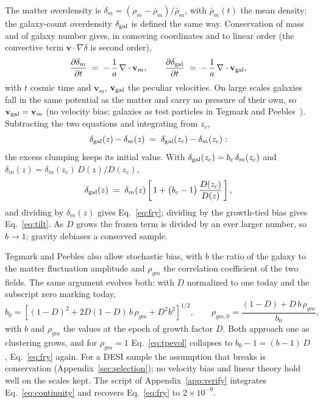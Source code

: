 The matter overdensity is $\delta_m = (\rho_m - \bar\rho_m)/\bar\rho_m$,
with $\bar\rho_m(t)$ the mean density; the galaxy-count overdensity
$\delta_{\rm gal}$ is defined the same way.  Conservation of mass and of
galaxy number gives, in comoving coordinates and to linear order (the
convective term $\mathbf{v} \cdot \nabla \delta$ is second order),
\begin{equation}
  \frac{\partial \delta_m}{\partial t}
  \;=\;
  -\,\frac{1}{a}\,\nabla \cdot \mathbf{v}_m,
  \qquad
  \frac{\partial \delta_{\rm gal}}{\partial t}
  \;=\;
  -\,\frac{1}{a}\,\nabla \cdot \mathbf{v}_{\rm gal},
  \label{eq:continuity}
\end{equation}
with $t$ cosmic time and $\mathbf{v}_m$, $\mathbf{v}_{\rm gal}$ the
peculiar velocities.  On large scales galaxies fall in the same
potential as the matter and carry no pressure of their own, so
$\mathbf{v}_{\rm gal} = \mathbf{v}_m$ (no velocity bias; galaxies as
test particles in Tegmark and Peebles~\cite{TegmarkPeebles1998}).
Subtracting the two equations and integrating from $z_c$,
\begin{equation}
  \delta_{\rm gal}(z) - \delta_m(z)
  \;=\;
  \delta_{\rm gal}(z_c) - \delta_m(z_c) :
  \label{eq:frozen}
\end{equation}
the excess clumping keeps its initial value.  With
$\delta_{\rm gal}(z_c) = b_c\,\delta_m(z_c)$ and
$\delta_m(z) = \delta_m(z_c)\, D(z)/D(z_c)$,
\begin{equation}
  \delta_{\rm gal}(z)
  \;=\;
  \delta_m(z)
  \left[\,1 + \bigl(b_c - 1\bigr)\,\frac{D(z_c)}{D(z)}\,\right],
  \label{eq:appsub}
\end{equation}
and dividing by $\delta_m(z)$ gives Eq.~\eqref{eq:fry}; dividing by the
growth-tied bias gives Eq.~\eqref{eq:tilt}.  As $D$ grows the frozen
term is divided by an ever larger number, so $b \to 1$: gravity
debiases a conserved sample.

Tegmark and Peebles also allow stochastic bias, with $b$ the ratio of
the galaxy to the matter fluctuation amplitude and $\rho_{gm}$ the
correlation coefficient of the two fields.  The same argument evolves
both: with $D$ normalized to one today and the subscript zero marking
today,
\begin{equation}
  b_0 =
  \left[(1 - D)^2 + 2 D (1 - D)\, b\, \rho_{gm}
  + D^2 b^2\right]^{1/2},
  \qquad
  \rho_{gm,0} = \frac{(1 - D) + D\, b\, \rho_{gm}}{b_0},
  \label{eq:tpevol}
\end{equation}
with $b$ and $\rho_{gm}$ the values at the epoch of growth factor $D$.
Both approach one as clustering grows, and for $\rho_{gm} = 1$
Eq.~\eqref{eq:tpevol} collapses to $b_0 - 1 = (b - 1)\,D$,
Eq.~\eqref{eq:fry} again.  For a DESI sample the assumption that
breaks is conservation (Appendix~\ref{sec:selection}); no velocity
bias and linear theory hold well on the scales kept.  The script of
Appendix~\ref{app:verify} integrates Eq.~\eqref{eq:continuity} and
recovers Eq.~\eqref{eq:fry} to $2 \times 10^{-9}$.

